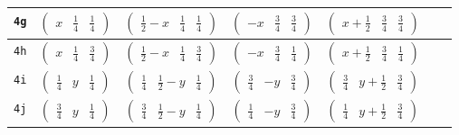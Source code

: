 \documentclass[fleqn,9pt,landscape]{jsarticle}
\begin{document}
\begin{center}
\begin{longtable}{ccccccc}
{\tt 4g} & $ \begin{pmatrix} x & \frac{1}{4} & \frac{1}{4} \end{pmatrix} $ & $ \begin{pmatrix} \frac{1}{2} - x & \frac{1}{4} & \frac{1}{4} \end{pmatrix} $ & $ \begin{pmatrix} - x & \frac{3}{4} & \frac{3}{4} \end{pmatrix} $ & $ \begin{pmatrix} x + \frac{1}{2} & \frac{3}{4} & \frac{3}{4} \end{pmatrix} $ & $  $ & $  $ \\ \hline
{\tt 4h} & $ \begin{pmatrix} x & \frac{1}{4} & \frac{3}{4} \end{pmatrix} $ & $ \begin{pmatrix} \frac{1}{2} - x & \frac{1}{4} & \frac{3}{4} \end{pmatrix} $ & $ \begin{pmatrix} - x & \frac{3}{4} & \frac{1}{4} \end{pmatrix} $ & $ \begin{pmatrix} x + \frac{1}{2} & \frac{3}{4} & \frac{1}{4} \end{pmatrix} $ & $  $ & $  $ \\ \hline
{\tt 4i} & $ \begin{pmatrix} \frac{1}{4} & y & \frac{1}{4} \end{pmatrix} $ & $ \begin{pmatrix} \frac{1}{4} & \frac{1}{2} - y & \frac{1}{4} \end{pmatrix} $ & $ \begin{pmatrix} \frac{3}{4} & - y & \frac{3}{4} \end{pmatrix} $ & $ \begin{pmatrix} \frac{3}{4} & y + \frac{1}{2} & \frac{3}{4} \end{pmatrix} $ & $  $ & $  $ \\ \hline
{\tt 4j} & $ \begin{pmatrix} \frac{3}{4} & y & \frac{1}{4} \end{pmatrix} $ & $ \begin{pmatrix} \frac{3}{4} & \frac{1}{2} - y & \frac{1}{4} \end{pmatrix} $ & $ \begin{pmatrix} \frac{1}{4} & - y & \frac{3}{4} \end{pmatrix} $ & $ \begin{pmatrix} \frac{1}{4} & y + \frac{1}{2} & \frac{3}{4} \end{pmatrix} $ & $  $ & $  $ \\ \hline

\end{longtable}
\end{center}
\end{document}
